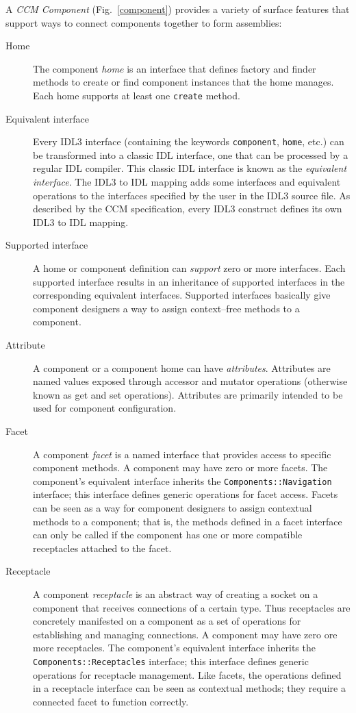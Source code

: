 A {\it CCM Component} (Fig.~\ref{component}) provides a variety of surface
features that support ways to connect components together to form assemblies:
\begin{description}
\item [Home]
The component {\it home} is an interface that defines factory and finder methods
to create or find component instances that the home manages. Each home supports
at least one {\tt create} method.

\item [Equivalent interface]
Every IDL3 interface (containing the keywords {\tt component}, {\tt home}, etc.)
can be transformed into a classic IDL interface, one that can be processed by a
regular IDL compiler. This classic IDL interface is known as the {\it equivalent
interface\/}. The IDL3 to IDL mapping adds some interfaces and equivalent
operations to the interfaces specified by the user in the IDL3 source file. As
described by the CCM specification, every IDL3 construct defines its own IDL3 to
IDL mapping.

\item [Supported interface]
A home or component definition can {\it support} zero or more interfaces. Each
supported interface results in an inheritance of supported interfaces in the
corresponding equivalent interfaces. Supported interfaces basically give
component designers a way to assign context--free methods to a component.

\item [Attribute]
A component or a component home can have {\it attributes\/}. Attributes are
named values exposed through accessor and mutator operations (otherwise known as
get and set operations). Attributes are primarily intended to be used for
component configuration.

\item [Facet]
A component {\it facet} is a named interface that provides access to specific
component methods. A component may have zero or more facets. The component's
equivalent interface inherits the {\tt Components::Navigation} interface; this
interface defines generic operations for facet access. Facets can be seen as a
way for component designers to assign contextual methods to a component; that
is, the methods defined in a facet interface can only be called if the component
has one or more compatible receptacles attached to the facet.

\item [Receptacle]
A component {\it receptacle} is an abstract way of creating a socket on a
component that receives connections of a certain type. Thus receptacles are
concretely manifested on a component as a set of operations for establishing and
managing connections. A component may have zero ore more receptacles. The
component's equivalent interface inherits the {\tt Components::Receptacles}
interface; this interface defines generic operations for receptacle management.
Like facets, the operations defined in a receptacle interface can be seen as
contextual methods; they require a connected facet to function correctly.


\end{description}
